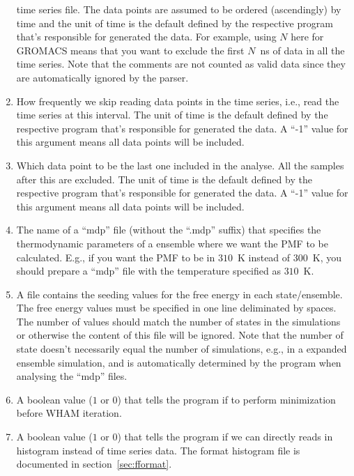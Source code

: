 \begin{enumerate}
  time series file. The data points are assumed to be ordered (ascendingly) by
  time and the unit of time is the default defined by the respective program
  that's responsible for generated the data. For example, using $N$ here for
  GROMACS means that you want to exclude the first $N$~ns of data in all the
  time series. Note that the comments are not counted as valid data since they
  are automatically ignored by the parser.
  \item How frequently we skip reading data points in the time series, i.e.,
  read the time series at this interval. The unit of time is the default
  defined by the respective program that's responsible for generated the data.
  A ``-1'' value for this argument means all data points will be included.
  \item Which data point to be the last one included in the analyse. All the
  samples after this are excluded. The unit of time is the default defined by
  the respective program that's responsible for generated the data. A ``-1''
  value for this argument means all data points will be included.
  \item The name of a ``mdp'' file (without the ``.mdp'' suffix) that specifies 
  the thermodynamic parameters of a ensemble where we want the PMF to be calculated.
  E.g., if you want the PMF to be in $310$~K instead of $300$~K, you should prepare
  a ``mdp'' file with the temperature specified as $310$~K.
  \item A file contains the seeding values for the free energy in each state/ensemble.
  The free energy values must be specified in one line deliminated by spaces. 
  The number of values should match the number of states in the simulations or otherwise
  the content of this file will be ignored. Note that the number of state doesn't 
  necessarily equal the number of simulations, e.g., in a expanded ensemble simulation, 
  and is automatically determined by the program when analysing the ``mdp'' files.
  \item A boolean value ($1$ or $0$) that tells the program if to perform
  minimization before WHAM iteration.
  \item A boolean value ($1$ or $0$) that tells the program if we can directly reads 
  in histogram instead of time series data. The format histogram file is documented in 
  section~\ref{sec:fformat}.
\end{enumerate}

